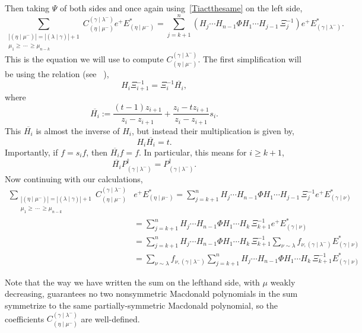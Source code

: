 \documentclass[11pt]{article}
\theoremstyle{definition}
\numberwithin{equation}{section}
\newcommand{\ep}{e^+}
\newcommand{\Estar}[1]{E^*_{#1}}
\newcommand{\PB}[1]{P_{#1}^\dagger}
\newcommand{\nudom}{{( \lambda \mid \gamma )}}
\newcommand{\lambdagamma}{{\nudom}}
\newcommand{\gammalambdamin}{{(\gamma \mid \lambda^-)}}
\newcommand{\gammanu}{{(\gamma \mid \nu)}}
\newcommand{\etamu}{{(\eta \mid \mu^-)}}
\newcommand{\fnu}{f_{\nu, \gammalambdamin}}
\begin{document}
Then taking $\Psi$ of both sides and once again using~\eqref{Tiactthesame} on the left side,
\begin{equation}\label{bothsides}  \sum_{\substack{|\etamu| = |\lambdagamma| + 1 \\ \mu_1 \geq \, \dotsm \, \geq \mu_{n-k}}}  C^{\gammalambdamin}_{\etamu} e^+ \Estar{\etamu} = \sum_{j=k+1}^n \left( H_j \dotsm H_{n-1} \Phi H_1 \dotsm H_{j-1} \, \Xi_j^{-1} \right) \ep \Estar{\gammalambdamin}.\end{equation}
This is the equation we will use to compute $C_{\etamu}^{\gammalambdamin}$. The first simplification will be using the relation (see ~\cite{MR1456318}),
\[ H_i \Xi_{i+1}^{-1} = \Xi^{-1}_i \overline{H_i},\]
where 
\[\overline{H_i} := \frac{(t-1)z_{i+1}}{z_i-z_{i+1}} + \frac{z_i-tz_{i+1}}{z_i-z_{i+1}} s_i.\]
This $\overline{H_i}$ is almost the inverse of $H_i$, but instead their multiplication is given by,
\[H_i \overline{H_i} = t.\] Importantly, if $f=s_i f$, then $\overline{H_i} f = f$. In particular, this means for $i\geq k+1$,
\[ \overline{H_i} \PB{\gammalambdamin} = \PB{\gammalambdamin}.\]
Now continuing with our calculations,
\begin{align*}
   \sum_{\substack{|\etamu| = |\lambdagamma| + 1 \\ \mu_1 \geq \, \dotsm \, \geq \mu_{n-k}}}  C^{\gammalambdamin}_{\etamu} &e^+ \Estar{\etamu}  =  \sum_{j=k+1}^n  H_j \dotsm H_{n-1} \Phi H_1 \dotsm H_{j-1} \, \Xi_j^{-1} \ep \Estar{\gammanu}\\  
    &=  \sum_{j=k+1}^n  H_j \dotsm H_{n-1} \Phi H_1 \dotsm H_{k} \, \Xi_{k+1}^{-1}  \ep \Estar{\gammanu}\\
    &= \sum_{j=k+1}^n H_j \dotsm H_{n-1} \Phi H_1 \dotsm H_{k} \, \Xi_{k+1}^{-1} \sum_{\nu \sim \lambda} \fnu \Estar{\gammanu} \\
    &=  \sum_{\nu \sim \lambda} \fnu  \sum_{j=k+1}^n H_j \dotsm H_{n-1} \Phi H_1 \dotsm H_{k} \, \Xi_{k+1}^{-1} \Estar{\gammanu}
\end{align*}



Note that the way we have written the sum on the lefthand side, with $\mu$ weakly decreasing, guarantees no two nonsymmetric Macdonald polynomials in the sum symmetrize to the same partially-symmetric Macdonald polynomial, so the coefficients $C_{\etamu}^{\gammalambdamin}$ are well-defined.
\end{document}
